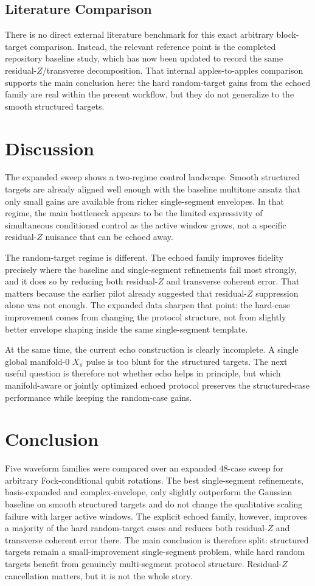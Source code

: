 \documentclass[aps,pra,twocolumn,reprint,floatfix,amsmath,amssymb]{revtex4-2}
\begin{document}
\subsection{Literature Comparison}
There is no direct external literature benchmark for this exact arbitrary block-target comparison. Instead, the relevant reference point is the completed repository baseline study, which has now been updated to record the same residual-$Z$/transverse decomposition. That internal apples-to-apples comparison supports the main conclusion here: the hard random-target gains from the echoed family are real within the present workflow, but they do not generalize to the smooth structured targets.

\section{Discussion}
The expanded sweep shows a two-regime control landscape. Smooth structured targets are already aligned well enough with the baseline multitone ansatz that only small gains are available from richer single-segment envelopes. In that regime, the main bottleneck appears to be the limited expressivity of simultaneous conditioned control as the active window grows, not a specific residual-$Z$ nuisance that can be echoed away.

The random-target regime is different. The echoed family improves fidelity precisely where the baseline and single-segment refinements fail most strongly, and it does so by reducing both residual-$Z$ and transverse coherent error. That matters because the earlier pilot already suggested that residual-$Z$ suppression alone was not enough. The expanded data sharpen that point: the hard-case improvement comes from changing the protocol structure, not from slightly better envelope shaping inside the same single-segment template.

At the same time, the current echo construction is clearly incomplete. A single global manifold-0 $X_\pi$ pulse is too blunt for the structured targets. The next useful question is therefore not whether echo helps in principle, but which manifold-aware or jointly optimized echoed protocol preserves the structured-case performance while keeping the random-case gains.

\section{Conclusion}
Five waveform families were compared over an expanded $48$-case sweep for arbitrary Fock-conditional qubit rotations. The best single-segment refinements, basis-expanded and complex-envelope, only slightly outperform the Gaussian baseline on smooth structured targets and do not change the qualitative scaling failure with larger active windows. The explicit echoed family, however, improves a majority of the hard random-target cases and reduces both residual-$Z$ and transverse coherent error there. The main conclusion is therefore split: structured targets remain a small-improvement single-segment problem, while hard random targets benefit from genuinely multi-segment protocol structure. Residual-$Z$ cancellation matters, but it is not the whole story.
\end{document}
